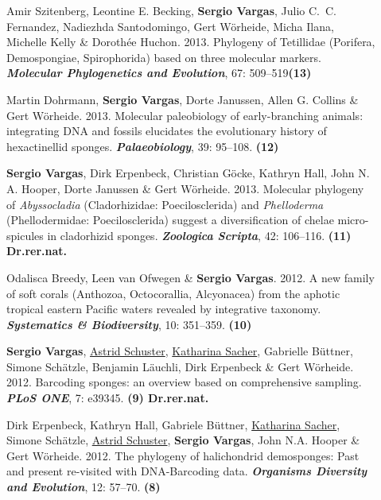 \documentclass[letter,10pt]{article}
\begin{document}
\begin{description}
\item[]Amir Szitenberg, Leontine E. Becking, \textbf{Sergio Vargas}, Julio C.~C. Fernandez, Nadiezhda Santodo\-mingo, Gert W\"orheide, Micha Ilana, Michelle Kelly \& Doroth\'ee Huchon. 2013. Phylogeny of Tetillidae (Porifera, Demospongiae, Spirophorida) based on three molecular markers. \textbf{\emph{Molecular Phylogenetics and Evolution}}, 67: 509--519\hfill\textbf{{\scriptsize (13)}}

\item[]Martin Dohrmann, \textbf{Sergio Vargas}, Dorte Janussen, Allen G. Collins \& Gert W\"orheide. 2013. Molecular paleobiology of early-branching animals: integrating DNA and fossils elucidates the evolutionary history of hexactinellid sponges. \textbf{\emph{Palaeobiology}}, 39: 95--108. \hfill\textbf{{\scriptsize (12)}}

\item[]\textbf{Sergio Vargas}, Dirk Erpenbeck, Christian G\"ocke, Kathryn Hall, John N. A. Hooper, Dorte Janussen \& Gert W\"orheide. 2013. Molecular phylogeny of \emph{Abyssocladia} (Cladorhizidae: Poecilosclerida) and \emph{Phelloderma} (Phellodermidae: Poecilosclerida) suggest a diversification of chelae micro-spicules in cladorhizid sponges. \textbf{\emph{Zoologica Scripta}}, 42: 106--116. \hfill\textbf{{\scriptsize (11) Dr.rer.nat.}}

\item[]Odalisca Breedy, Leen van Ofwegen \& \textbf{Sergio Vargas}. 2012. A new family of soft corals (Anthozoa, Octocorallia, Alcyonacea) from the aphotic tropical eastern Pacific waters revealed by integrative taxonomy. \textbf{\emph{Systematics \& Biodiversity}}, 10: 351--359. \hfill\textbf{{\scriptsize (10)}}

\item[]\textbf{Sergio Vargas}, \underline{Astrid Schuster}, \underline{Katharina Sacher}, Gabrielle B\"uttner, Simone Sch\"atzle, Benjamin L\"auchli, Dirk Erpenbeck \& Gert W\"orheide. 2012. Barcoding sponges: an overview based on comprehensive sampling. \textbf{\emph{PLoS ONE}}, 7: e39345. \hfill\textbf{{\scriptsize (9) Dr.rer.nat.}}

\item[]Dirk Erpenbeck, Kathryn Hall, Gabriele B\"uttner, \underline{Katharina Sacher}, Simone Sch\"atzle, \underline{Astrid Schuster}, \textbf{Sergio Vargas},  John N.A. Hooper \& Gert W\"orheide. 2012. The phylogeny of halichondrid demosponges: Past and present re-visited with DNA-Barcoding data. \textbf{\emph{Organisms Diversity and Evolution}}, 12: 57--70. \hfill\textbf{{\scriptsize (8)}}


\end{description}
\end{document}

